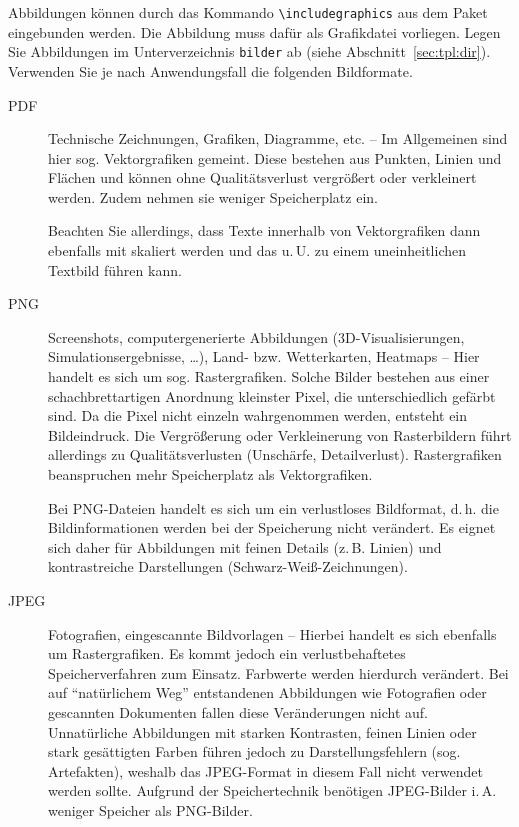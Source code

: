 Abbildungen können durch das Kommando \lstinline+\includegraphics+ aus dem
Paket~ eingebunden werden. Die Abbildung muss dafür als Grafikdatei
vorliegen. Legen Sie Abbildungen im Unterverzeichnis \texttt{bilder} ab
(siehe Abschnitt~\ref{sec:tpl:dir}). Verwenden Sie je nach Anwendungsfall die
folgenden Bildformate.

\begin{description}
\item[PDF] Technische Zeichnungen, Grafiken, Diagramme, etc. -- Im Allgemeinen
  sind hier sog. Vektorgrafiken gemeint. Diese bestehen aus Punkten, Linien
  und Flächen und können ohne Qualitätsverlust vergrößert oder verkleinert
  werden. Zudem nehmen sie weniger Speicherplatz ein.

  Beachten Sie allerdings, dass Texte innerhalb von Vektorgrafiken dann
  ebenfalls mit skaliert werden und das u.\,U. zu einem uneinheitlichen
  Textbild führen kann.

\item[PNG] Screenshots, computergenerierte Abbildungen (3D-Visualisierungen,
  Simulationsergebnisse, \dots), Land- bzw. Wetterkarten, Heatmaps -- Hier
  handelt es sich um sog. Rastergrafiken. Solche Bilder bestehen aus einer
  schachbrettartigen Anordnung kleinster Pixel, die unterschiedlich gefärbt
  sind. Da die Pixel nicht einzeln wahrgenommen werden, entsteht ein
  Bildeindruck. Die Vergrößerung oder Verkleinerung von Rasterbildern führt
  allerdings zu Qualitätsverlusten (Unschärfe, Detailverlust). Rastergrafiken
  beanspruchen mehr Speicherplatz als Vektorgrafiken.

  Bei PNG-Dateien handelt es sich um ein verlustloses Bildformat, d.\,h. die
  Bildinformationen werden bei der Speicherung nicht verändert. Es eignet sich
  daher für Abbildungen mit feinen Details (z.\,B. Linien) und kontrastreiche
  Darstellungen (Schwarz-Weiß-Zeichnungen).

\item[JPEG] Fotografien, eingescannte Bildvorlagen -- Hierbei handelt es sich
  ebenfalls um Rastergrafiken. Es kommt jedoch ein verlustbehaftetes
  Speicherverfahren zum Einsatz. Farbwerte werden hierdurch verändert. Bei
  auf "`natürlichem Weg"' entstandenen Abbildungen wie Fotografien oder
  gescannten Dokumenten fallen diese Veränderungen nicht auf. Unnatürliche
  Abbildungen mit starken Kontrasten, feinen Linien oder stark gesättigten
  Farben führen jedoch zu Darstellungsfehlern (sog. Artefakten), weshalb das
  JPEG-Format in diesem Fall nicht verwendet werden sollte. Aufgrund der
  Speichertechnik benötigen JPEG-Bilder i.\,A. weniger Speicher als PNG-Bilder.
\end{description}

